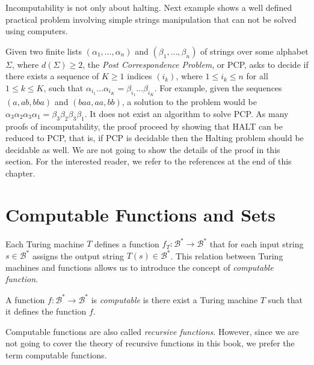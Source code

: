 Incomputability is not only about halting. Next example shows a well defined practical problem involving simple strings manipulation that can not be solved using computers.

\begin{example}
\label{ex:PCP}
Given two finite lists $\left( \alpha_1, \ldots, \alpha_n \right)$ and $\left( \beta_1, \ldots, \beta_n \right)$ of strings over some alphabet $\Sigma$, where $d(\Sigma) \ge 2$, the \emph{Post Correspondence Problem}, or PCP, asks to decide if there exists a sequence of $K \geq 1$ indices $(i_k)$, where $1 \le i_k \le n$ for all $1 \le k \le K$, such that $\alpha_{i_1} \ldots \alpha_{i_K} = \beta_{i_1} \ldots \beta_{i_K}$. For example, given the sequences $(a, ab, bba)$ and $(baa, aa, bb)$, a solution to the problem would be $\alpha_3 \alpha_2 \alpha_3 \alpha_1 = \beta_{3} \beta_{2} \beta_{3} \beta_{1}$. It does not exist an algorithm to solve PCP. As many proofs of incomputability, the proof proceed by showing that HALT can be reduced to PCP, that is, if PCP is decidable then the Halting problem should be decidable as well. We are not going to show the details of the proof in this section. For the interested reader, we refer to the references at the end of this chapter.
\end{example}

%
%

\section{Computable Functions and Sets}
\label{sec:computable_functions}

Each Turing machine $T$ defines a function $f_T:\mathcal{B}^{\ast}\rightarrow\mathcal{B}^{\ast}$ that for each input string $s\in\mathcal{B}^{\ast}$ assigns the output string $T(s)\in\mathcal{B}^{\ast}$. This relation between Turing machines and functions allows us to introduce the concept of \emph{computable function}. 

\begin{definition}
\label{def:computable-function}
A function $f:\mathcal{B}^{\ast}\rightarrow\mathcal{B}^{\ast}$ is \emph{computable} is there exist a Turing machine $T$ such that it defines the function $f$.
\end{definition}

Computable functions are also called \emph{recursive functions}. However, since we are not going to cover the theory of recursive functions in this book, we prefer the term computable functions.

